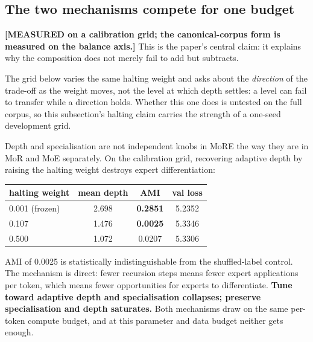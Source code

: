 \subsection{The two mechanisms compete for one budget}
\label{sec:competition}

\textbf{[MEASURED on a calibration grid; the canonical-corpus form is measured on
the balance axis.]} This is the paper's central claim: it explains why the
composition does not merely fail to add but subtracts.

The grid below varies the same halting weight and asks about the
\emph{direction} of the trade-off as the weight moves, not the level at which
depth settles: a level can fail to transfer while a direction holds. Whether this
one does is untested on the full corpus, so this subsection's halting claim
carries the strength of a one-seed development grid.

Depth and specialisation are not independent knobs in MoRE the way they are in MoR
and MoE separately. On the calibration grid, recovering adaptive depth by raising
the halting weight destroys expert differentiation:

\begin{center}
{\dispsize
\setlength{\tabcolsep}{4pt}\renewcommand{\arraystretch}{1.25}
\begin{tabular}{lccc}
\toprule
halting weight & mean depth & AMI & val loss \\
\midrule
0.001 (frozen) & 2.698 & \textbf{0.2851} & 5.2352 \\
0.107 & 1.476 & \textbf{0.0025} & 5.3346 \\
0.500 & 1.072 & 0.0207 & 5.3306 \\
\bottomrule
\end{tabular}
}
\end{center}

AMI of 0.0025 is statistically indistinguishable from the shuffled-label control.
The mechanism is direct: fewer recursion steps means fewer expert applications per
token, which means fewer opportunities for experts to differentiate. \textbf{Tune
toward adaptive depth and specialisation collapses; preserve specialisation and
depth saturates.} Both mechanisms draw on the same per-token compute budget, and at
this parameter and data budget neither gets enough.


